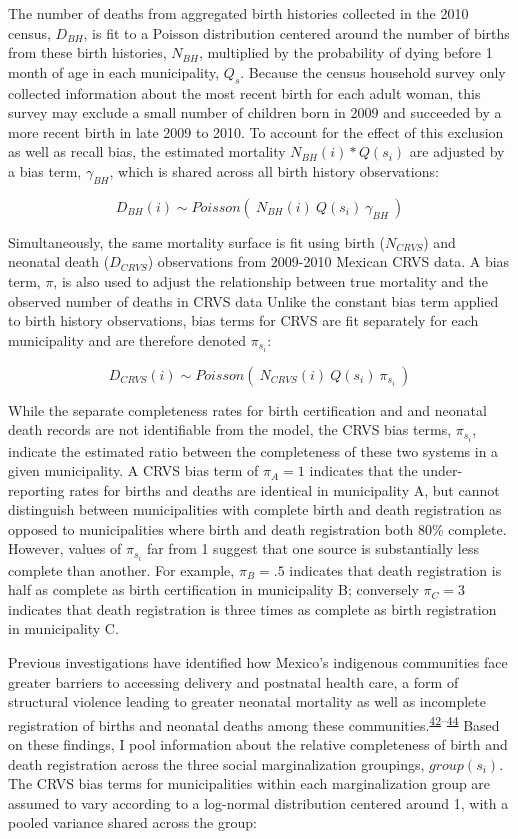 \documentclass[
]{article}
\begin{document}
The number of deaths from aggregated birth histories collected in the 2010 census, \(D_{BH}\), is fit to a Poisson distribution centered around the number of births from these birth histories, \(N_{BH}\), multiplied by the probability of dying before 1 month of age in each municipality, \(Q_s\). Because the census household survey only collected information about the most recent birth for each adult woman, this survey may exclude a small number of children born in 2009 and succeeded by a more recent birth in late 2009 to 2010. To account for the effect of this exclusion as well as recall bias, the estimated mortality \(N_{BH}(i)*Q(s_i)\) are adjusted by a bias term, \(\gamma_{BH}\), which is shared across all birth history observations:

\[ D_{BH}(i) \sim Poisson(~N_{BH}(i)~Q(s_i)~\gamma_{BH}~)\]

Simultaneously, the same mortality surface is fit using birth (\(N_{CRVS}\)) and neonatal death (\(D_{CRVS}\)) observations from 2009-2010 Mexican CRVS data. A bias term, \(\pi\), is also used to adjust the relationship between true mortality and the observed number of deaths in CRVS data Unlike the constant bias term applied to birth history observations, bias terms for CRVS are fit separately for each municipality and are therefore denoted \(\pi_{s_i}\):

\[D_{CRVS}(i) \sim Poisson(~N_{CRVS}(i)~Q(s_i)~\pi_{s_i}~)\]

While the separate completeness rates for birth certification and and neonatal death records are not identifiable from the model, the CRVS bias terms, \(\pi_{s_i}\), indicate the estimated ratio between the completeness of these two systems in a given municipality. A CRVS bias term of \(\pi_{A}=1\) indicates that the under-reporting rates for births and deaths are identical in municipality A, but cannot distinguish between municipalities with complete birth and death registration as opposed to municipalities where birth and death registration both 80\% complete. However, values of \(\pi_{s_i}\) far from 1 suggest that one source is substantially less complete than another. For example, \(\pi_B=.5\) indicates that death registration is half as complete as birth certification in municipality B; conversely \(\pi_C=3\) indicates that death registration is three times as complete as birth registration in municipality C.

Previous investigations have identified how Mexico's indigenous communities face greater barriers to accessing delivery and postnatal health care, a form of structural violence leading to greater neonatal mortality as well as incomplete registration of births and neonatal deaths among these communities.\textsuperscript{\protect\hyperlink{ref-Enciso2017}{42}--\protect\hyperlink{ref-Gamlin2020}{44}} Based on these findings, I pool information about the relative completeness of birth and death registration across the three social marginalization groupings, \(group(s_i)\). The CRVS bias terms for municipalities within each marginalization group are assumed to vary according to a log-normal distribution centered around 1, with a pooled variance shared across the group:
\end{document}
